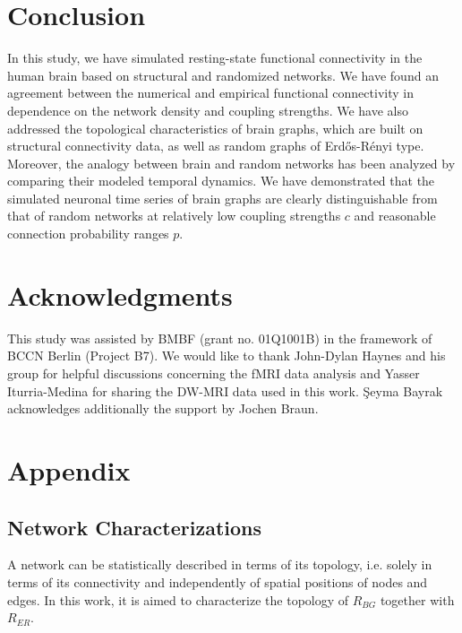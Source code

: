 \documentclass[fleqn,10pt]{wlpeerj}
\newcommand{\reg}[1]{~ \\ \textcolor{red}{\framebox{\begin{minipage}{0.9\linewidth}\footnotesize\em
#1  \end{minipage}}}\\}
\begin{document}
\section*{Conclusion}
In this study, we have simulated resting-state functional connectivity in the human brain based on structural and
randomized networks. We have found an agreement between the numerical and empirical functional connectivity in
dependence on the network density and coupling strengths.
We have also addressed the topological characteristics of brain graphs, which are built on structural connectivity data,
as well as random graphs of Erd\H{o}s-R\'{e}nyi type.
Moreover, the analogy between brain and random networks has been analyzed by comparing their modeled temporal
dynamics.  We have demonstrated that the simulated neuronal time series of brain graphs are clearly distinguishable
from that of random networks at relatively low coupling strengths $c$ and reasonable connection probability ranges $p$. 
 

\section*{Acknowledgments}
This study was assisted by BMBF (grant no. 01Q1001B) in the framework of BCCN Berlin (Project B7). We would like to
thank John-Dylan Haynes and his group for helpful discussions concerning the fMRI data analysis and Yasser
Iturria-Medina for sharing the DW-MRI data used in this work. \c{S}eyma Bayrak acknowledges additionally the support by
Jochen Braun.



\section*{Appendix}
\subsection*{Network Characterizations}
A network can be statistically described in terms of its topology, i.e. solely in terms of its connectivity and
independently of spatial positions of nodes and edges. In this work, it is aimed to characterize the topology of
$R_{BG}$ together with $R_{ER}$.   
\end{document}

